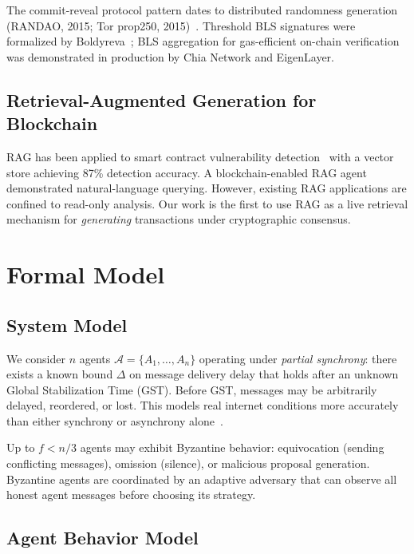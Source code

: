 \documentclass[11pt]{article}
\begin{document}
The commit-reveal protocol pattern dates to distributed randomness generation (RANDAO, 2015; Tor prop250, 2015)~\cite{randao, tor_prop250}. Threshold BLS signatures were formalized by Boldyreva~\cite{boldyreva2003}; BLS aggregation for gas-efficient on-chain verification was demonstrated in production by Chia Network and EigenLayer.

\subsection{Retrieval-Augmented Generation for Blockchain}

RAG has been applied to smart contract vulnerability detection~\cite{rag_smart_contract_audit} with a vector store achieving 87\% detection accuracy. A blockchain-enabled RAG agent~\cite{rag_blockchain_agent} demonstrated natural-language querying. However, existing RAG applications are confined to read-only analysis. Our work is the first to use RAG as a live retrieval mechanism for \emph{generating} transactions under cryptographic consensus.

\section{Formal Model}
\label{sec:model}

\subsection{System Model}

We consider $n$ agents $\mathcal{A} = \{A_1,\ldots,A_n\}$ operating under \emph{partial synchrony}: there exists a known bound $\Delta$ on message delivery delay that holds after an unknown Global Stabilization Time (GST). Before GST, messages may be arbitrarily delayed, reordered, or lost. This models real internet conditions more accurately than either synchrony or asynchrony alone~\cite{dls1988}.

Up to $f < n/3$ agents may exhibit Byzantine behavior: equivocation (sending conflicting messages), omission (silence), or malicious proposal generation. Byzantine agents are coordinated by an adaptive adversary that can observe all honest agent messages before choosing its strategy.

\subsection{Agent Behavior Model}
\end{document}
